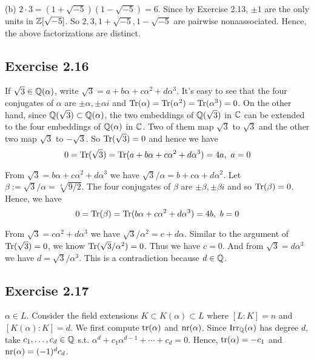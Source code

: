 \documentclass[../Marcus.tex]{subfiles}
\begin{document}
(b) $2\cdot3=(1+\sqrt{-5})(1-\sqrt{-5})=6$. Since by Exercise 2.13, $\pm1$ are the only units in $\mathbb{Z}[\sqrt{-5}]$. So $2,3,1+\sqrt{-5},1-\sqrt{-5}$ are pairwise nonaassociated. Hence, the above factorizations are distinct.

\subsection*{Exercise 2.16}

If $\sqrt{3}\in\mathbb{Q}(\alpha)$, write $\sqrt{3}=a+b\alpha+c\alpha^2+d\alpha^3$. It's easy to see that the four conjugates of $\alpha$ are $\pm\alpha,\pm\alpha i$ and $\operatorname{Tr}(\alpha)=\operatorname{Tr}(\alpha^2)=\operatorname{Tr}(\alpha^3)=0$. On the other hand, since $\mathbb{Q}(\sqrt{3})\subset\mathbb{Q}(\alpha)$, the two embeddings of $\mathbb{Q}(\sqrt{3})$ in $\mathbb{C}$ can be extended to the four embeddings of $\mathbb{Q}(\alpha)$ in $\mathbb{C}$. Two of them map $\sqrt{3}$ to $\sqrt{3}$ and the other two map $\sqrt{3}$ to $-\sqrt{3}$. So $\operatorname{Tr}(\sqrt{3})=0$ and hence we have $$0=\operatorname{Tr}(\sqrt{3})=\operatorname{Tr}(a+b\alpha+c\alpha^2+d\alpha^3)=4a, \ a=0$$

From $\sqrt{3}=b\alpha+c\alpha^2+d\alpha^3$ we have $\sqrt{3}/\alpha=b+c\alpha+d\alpha^2$. Let $\beta:=\sqrt{3}/\alpha=\sqrt[4]{9/2}$. The four conjugates of $\beta$ are $\pm\beta,\pm\beta i$ and so $\operatorname{Tr}(\beta)=0$. Hence, we have $$0=\operatorname{Tr}(\beta)=\operatorname{Tr}(b\alpha+c\alpha^2+d\alpha^3)=4b, \ b=0$$

From  $\sqrt{3}=c\alpha^2+d\alpha^3$ we have $\sqrt{3}/\alpha^2=c+d\alpha$. Similar to the argument of $\operatorname{Tr}(\sqrt{3})=0$, we know $\operatorname{Tr}(\sqrt{3}/\alpha^2)=0$. Thus we have $c=0$. And from $\sqrt{3}=d\alpha^3$ we have $d=\sqrt{3}/\alpha^3$. This is a contradiction because $d\in\mathbb{Q}$.

\subsection*{Exercise 2.17}

$\alpha\in L$. Consider the field extensions $K\subset K(\alpha)\subset L$ where $[L:K]=n$ and $[K(\alpha):K]=d$. We first compute $\operatorname{tr}(\alpha)$ and $\operatorname{nr}(\alpha)$. Since $\operatorname{Irr}_{\mathbb{Q}}(\alpha)$ has degree $d$, take $c_1,\ldots,c_d\in\mathbb{Q}$ s.t. $\alpha^d+c_1\alpha^{d-1}+\cdots+c_d=0$. Hence, $\operatorname{tr}(\alpha)=-c_1$ and $\operatorname{nr}(\alpha)=(-1)^{d}c_d$.
\end{document}
